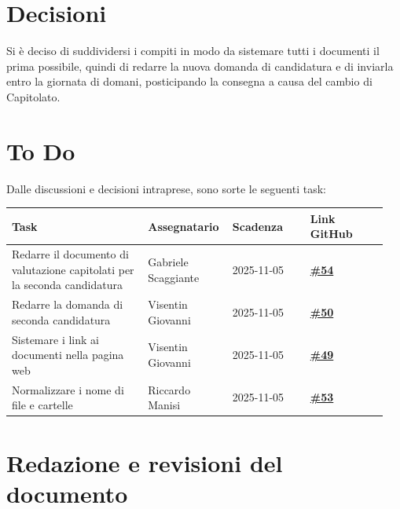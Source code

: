 \documentclass[a4paper,12pt]{article}
\begin{document}
	\section{Decisioni}
	Si \`e deciso di suddividersi i compiti in modo da sistemare tutti i documenti il prima possibile, quindi di redarre la nuova domanda di candidatura e di inviarla entro la giornata di domani, posticipando la consegna a causa del cambio di Capitolato.
	
	\section{To Do}
	Dalle discussioni e decisioni intraprese, sono sorte le seguenti task:
	
	\begin{center}
		\small
		\renewcommand{\arraystretch}{1.2} 
		\begin{tabular}{|p{0.35\linewidth}|p{0.2\linewidth}|p{0.2\linewidth}|p{0.2\linewidth}|}
			\hline
			\rowcolor{gray!60} 
			\textbf{Task} & \textbf{Assegnatario} & \textbf{Scadenza} & \textbf{Link GitHub} \\
			\hline
			\rowcolor{white}
			Redarre il documento di valutazione capitolati per la seconda candidatura & Gabriele Scaggiante & 2025-11-05 & \href{https://github.com/SWE-BitByBit/SWE-project/issues/54}{\textbf{\#54}} \\
			\hline
			\rowcolor{gray!20}
			Redarre la domanda di seconda candidatura & Visentin Giovanni & 2025-11-05 & \href{https://github.com/SWE-BitByBit/SWE-project/issues/50}{\textbf{\#50}} \\
			\hline
			\rowcolor{white}
			Sistemare i link ai documenti nella pagina web & Visentin Giovanni & 2025-11-05 & \href{https://github.com/SWE-BitByBit/SWE-project/issues/49}{\textbf{\#49}} \\
			\hline
			\rowcolor{gray!20}
			Normalizzare i nome di file e cartelle & Riccardo Manisi & 2025-11-05 & \href{https://github.com/SWE-BitByBit/SWE-project/issues/53}{\textbf{\#53}} \\
			\hline
		\end{tabular}
	\end{center}
	
	\clearpage
	\section{Redazione e revisioni del documento}
	
\end{document}
